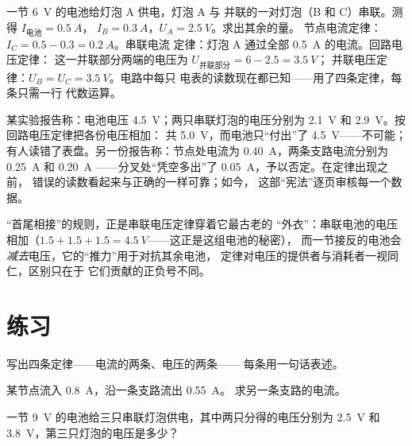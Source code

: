 \begin{example}[例题：混联电路]\label{ex:g8:circuit-laws:worked}
一节 \qty{6}{V} 的电池给灯泡 A 供电，灯泡 A 与
并联的一对灯泡（B 和 C）串联。测得 $I_{\text{电池}} = \qty{0.5}{A}$，
$I_B = \qty{0.3}{A}$，$U_A = \qty{2.5}{V}$。求出其余的量。
节点电流定律：$I_C = 0.5 - 0.3 = \qty{0.2}{A}$。串联电流
定律：灯泡 A 通过全部 \qty{0.5}{A} 的电流。回路电压定律：
这一并联部分两端的电压为 $U_{\text{并联部分}} = 6 - 2.5 = \qty{3.5}{V}$；
并联电压定律：$U_B = U_C = \qty{3.5}{V}$。电路中每只
电表的读数现在都已知——用了四条定律，每条只需一行
代数运算。
\end{example}

\begin{example}[用定律辨别真伪]\label{ex:g8:circuit-laws:liedetector}
某实验报告称：电池电压 \qty{4.5}{V}；两只串联灯泡的电压分别为
\qty{2.1}{V} 和 \qty{2.9}{V}。按回路电压定律把各份电压相加：
共 \qty{5.0}{V}，而电池只“付出”了 \qty{4.5}{V}——不可能；
有人读错了表盘。另一份报告称：节点处电流为
\qty{0.40}{A}，两条支路电流分别为 \qty{0.25}{A} 和 \qty{0.20}{A}
——分叉处“凭空多出”了 \qty{0.05}{A}，予以否定。在定律出现之前，
错误的读数看起来与正确的一样可靠；如今，
这部“宪法”逐页审核每一个数据。
\end{example}

\begin{remark}[同样定律下的电池]\label{rem:g8:circuit-laws:batteries}
“首尾相接”的规则，正是串联电压定律穿着它最古老的
“外衣”：串联电池的电压相加（$1.5 +
1.5 + 1.5 = \qty{4.5}{V}$——这正是这组电池的秘密），
而一节接反的电池会\emph{减去}电压，它的“推力”用于对抗其余电池，
定律对电压的提供者与消耗者一视同仁，区别只在于
它们贡献的正负号不同。
\end{remark}

\section{练习}

\begin{exercise}[$\star$]\label{exo:g8:circuit-laws:1}
写出四条定律——电流的两条、电压的两条——
每条用一句话表述。
\end{exercise}

\begin{exercise}[$\star$]\label{exo:g8:circuit-laws:2}
某节点流入 \qty{0.8}{A}，沿一条支路流出 \qty{0.55}{A}。
求另一条支路的电流。
\end{exercise}

\begin{exercise}[$\star$]\label{exo:g8:circuit-laws:3}
一节 \qty{9}{V} 的电池给三只串联灯泡供电，其中两只分得的电压分别为
\qty{2.5}{V} 和 \qty{3.8}{V}，第三只灯泡的电压是多少？
\end{exercise}

